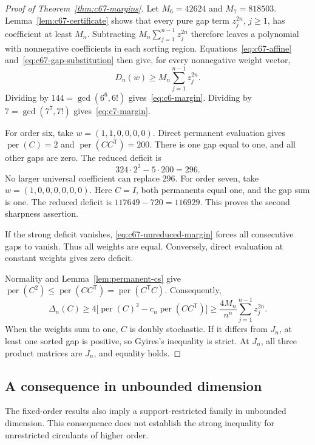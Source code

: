 \documentclass[11pt,a4paper]{article}
\theoremstyle{definition}
\theoremstyle{remark}
\newcommand{\per}{\operatorname{per}}
\newcommand{\T}{\mathsf{T}}
\begin{document}
\begin{proof}[Proof of Theorem~\ref{thm:c67-margins}]
Let $M_6=42624$ and $M_7=818503$.
Lemma~\ref{lem:c67-certificate} shows that every pure gap term
$z_j^{2n}$, $j\ge1$, has coefficient at least $M_n$.
Subtracting $M_n\sum_{j=1}^{n-1}z_j^{2n}$ therefore leaves a polynomial
with nonnegative coefficients in each sorting region.
Equations~\eqref{eq:c67-affine} and~\eqref{eq:c67-gap-substitution}
then give, for every nonnegative weight vector,
\begin{equation}\label{eq:c67-unreduced-margin}
 D_n(w)\ge M_n\sum_{j=1}^{n-1}z_j^{2n}.
\end{equation}
Dividing by $144=\gcd(6^6,6!)$ gives~\eqref{eq:c6-margin}.
Dividing by $7=\gcd(7^7,7!)$ gives~\eqref{eq:c7-margin}.

For order six, take $w=(1,1,0,0,0,0)$.
Direct permanent evaluation gives $\per(C)=2$ and
$\per(CC^\T)=200$. There is one gap equal to one, and all other gaps
are zero. The reduced deficit is
\[
 324\cdot2^2-5\cdot200=296.
\]
No larger universal coefficient can replace $296$.
For order seven, take $w=(1,0,0,0,0,0,0)$.
Here $C=I$, both permanents equal one, and the gap sum is one.
The reduced deficit is $117649-720=116929$.
This proves the second sharpness assertion.

If the strong deficit vanishes,
\eqref{eq:c67-unreduced-margin} forces all consecutive gaps to vanish.
Thus all weights are equal. Conversely, direct evaluation at constant
weights gives zero deficit.

Normality and Lemma~\ref{lem:permanent-cs} give
$\per(C^2)\le\per(CC^\T)=\per(C^{\T}C)$.
Consequently,
\begin{equation}\label{eq:c67-gyires-margin}
 \Delta_n(C)
 \ge4\bigl[\per(C)^2-c_n\per(CC^\T)\bigr]
 \ge\frac{4M_n}{n^n}\sum_{j=1}^{n-1}z_j^{2n}.
\end{equation}
When the weights sum to one, $C$ is doubly stochastic.
If it differs from $J_n$, at least one sorted gap is positive, so
Gyires's inequality is strict. At $J_n$, all three product matrices
are $J_n$, and equality holds.
\end{proof}

\subsection{A consequence in unbounded dimension}

The fixed-order results also imply a support-restricted family in
unbounded dimension. This consequence does not establish the strong
inequality for unrestricted circulants of higher order.
\end{document}
